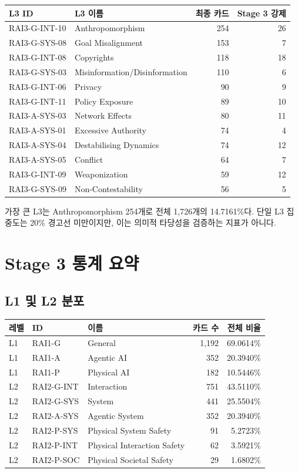 \documentclass[11pt,a4paper]{article}
\begin{document}
\begin{longtable}{llrr}
\toprule
L3 ID & L3 이름 & 최종 카드 & Stage 3 강제 \\
\midrule
\endhead
RAI3-G-INT-10 & Anthropomorphism & 254 & 26 \\
RAI3-G-SYS-08 & Goal Misalignment & 153 & 7 \\
RAI3-G-INT-08 & Copyrights & 118 & 18 \\
RAI3-G-SYS-03 & Misinformation/Disinformation & 110 & 6 \\
RAI3-G-INT-06 & Privacy & 90 & 9 \\
RAI3-G-INT-11 & Policy Exposure & 89 & 10 \\
RAI3-A-SYS-03 & Network Effects & 80 & 11 \\
RAI3-A-SYS-01 & Excessive Authority & 74 & 4 \\
RAI3-A-SYS-04 & Destabilising Dynamics & 74 & 12 \\
RAI3-A-SYS-05 & Conflict & 64 & 7 \\
RAI3-G-INT-09 & Weaponization & 59 & 12 \\
RAI3-G-SYS-09 & Non-Contestability & 56 & 5 \\
\bottomrule
\end{longtable}

가장 큰 L3는 Anthropomorphism 254개로 전체 1,726개의 14.7161\%다. 단일 L3
집중도는 20\% 경고선 미만이지만, 이는 의미적 타당성을 검증하는 지표가 아니다.

\section{Stage 3 통계 요약}

\subsection{L1 및 L2 분포}

\begin{longtable}{lllrr}
\toprule
레벨 & ID & 이름 & 카드 수 & 전체 비율 \\
\midrule
\endhead
L1 & RAI1-G & General & 1,192 & 69.0614\% \\
L1 & RAI1-A & Agentic AI & 352 & 20.3940\% \\
L1 & RAI1-P & Physical AI & 182 & 10.5446\% \\
\midrule
L2 & RAI2-G-INT & Interaction & 751 & 43.5110\% \\
L2 & RAI2-G-SYS & System & 441 & 25.5504\% \\
L2 & RAI2-A-SYS & Agentic System & 352 & 20.3940\% \\
L2 & RAI2-P-SYS & Physical System Safety & 91 & 5.2723\% \\
L2 & RAI2-P-INT & Physical Interaction Safety & 62 & 3.5921\% \\
L2 & RAI2-P-SOC & Physical Societal Safety & 29 & 1.6802\% \\
\bottomrule
\end{longtable}
\end{document}
